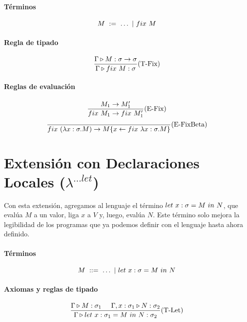 \documentclass[10pt,a4paper]{article}
\begin{document}
\paragraph{Términos}
$$M~:=~\dots~|~fix~M$$

\paragraph{Regla de tipado}
\begin{equation*}
    \frac{\Gamma\triangleright M : \sigma\to\sigma}{\Gamma\triangleright fix~M : \sigma}(\text{T-Fix})
\end{equation*}

\paragraph{Reglas de evaluación}
\begin{equation*}
    \frac{M_1\to M'_1}{fix~M_1\to fix~M'_1}(\text{E-Fix})
\end{equation*}
\vspace*{5mm}
\begin{equation*}
\frac{}{fix~(\lambda x: \sigma . M)\to M\{x\leftarrow fix~\lambda x: \sigma . M\}}(\text{E-FixBeta})
\end{equation*}

\section{Extensión con Declaraciones Locales (\texorpdfstring{$\lambda^{...let}$}{lambda ...let})}\label{extension_lambda:let}

Con esta extensión, agregamos al lenguaje el término $let~x:\sigma = M~in~N$, que evalúa $M$ a un valor, liga $x$ a $V$ y, luego, evalúa $N$. Este término solo mejora la legibilidad de los programas que ya podemos definir con el lenguaje hasta ahora definido.

\paragraph{Términos}
$$ M~::=~ \dots~|~let~x:\sigma = M~in~N $$


\paragraph{Axiomas y reglas de tipado}
\begin{equation*}
\frac{\Gamma\triangleright M : \sigma_1\hspace*{5mm}\Gamma,x:\sigma_1\triangleright N : \sigma_2}{\Gamma\triangleright let~x:\sigma_1 = M~in~N : \sigma_2}(\text{T-Let})
\end{equation*}
\end{document}

